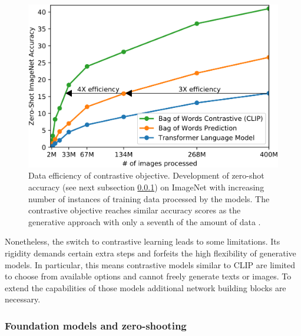 \documentclass[
]{krantz}
\begin{document}
\begin{figure}

{\centering \includegraphics[width=1\linewidth]{figures/02-04-text-support-img/data-efficiency} 

}

\caption{Data efficiency of contrastive objective. Development of zero-shot accuracy (see next subsection \ref{foundMod}) on ImageNet with increasing number of instances of training data processed by the models. The contrastive objective reaches similar accuracy scores as the generative approach with only a seventh of the amount of data \citep{radford2021learning}.}\label{fig:data-efficiency}
\end{figure}



Nonetheless, the switch to contrastive learning leads to some limitations.
Its rigidity demands certain extra steps and forfeits the high flexibility of generative models.
In particular, this means contrastive models similar to CLIP are limited to choose from available options and cannot freely generate texts or images.
To extend the capabilities of those models additional network building blocks are necessary.

\hypertarget{foundMod}{%
\subsubsection{Foundation models and zero-shooting}\label{foundMod}}
\end{document}

